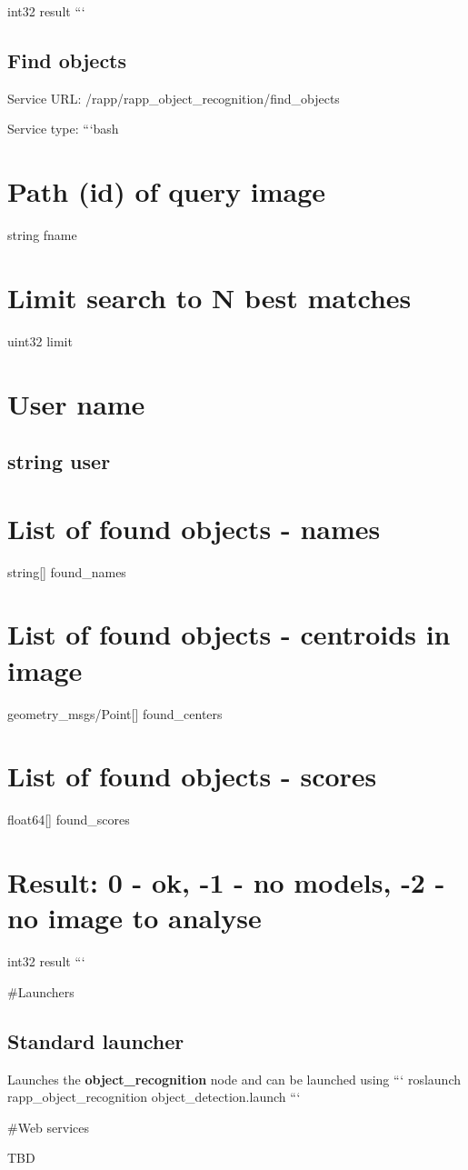 int32 result ```

\subsection*{Find objects}

Service U\-R\-L\-: {\ttfamily /rapp/rapp\-\_\-object\-\_\-recognition/find\-\_\-objects}

Service type\-: ```bash \section*{Path (id) of query image}

string fname \section*{Limit search to N best matches}

uint32 limit \section*{User name}

\subsection*{string user }

\section*{List of found objects -\/ names}

string\mbox{[}\mbox{]} found\-\_\-names \section*{List of found objects -\/ centroids in image}

geometry\-\_\-msgs/\-Point\mbox{[}\mbox{]} found\-\_\-centers \section*{List of found objects -\/ scores}

float64\mbox{[}\mbox{]} found\-\_\-scores \section*{Result\-: 0 -\/ ok, -\/1 -\/ no models, -\/2 -\/ no image to analyse}

int32 result ```

\#\-Launchers

\subsection*{Standard launcher}

Launches the {\bfseries object\-\_\-recognition} node and can be launched using ``` roslaunch rapp\-\_\-object\-\_\-recognition object\-\_\-detection.\-launch ```

\#\-Web services

T\-B\-D 